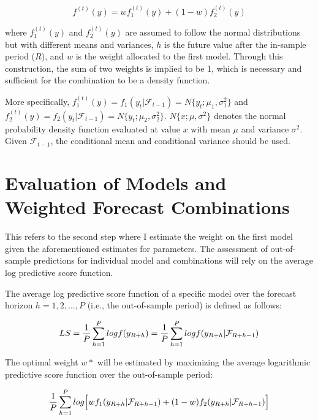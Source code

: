 \documentclass{monashthesis}
\begin{document}
\begin{equation}
f^{(t)}(y) = wf^{(t)}_1(y) + (1-w)f^{(t)}_2(y)
\end{equation}

where \(f^{(t)}_1(y)\) and \(f^{(t)}_2(y)\) are assumed to follow the normal distributions but with different means and variances, \(h\) is the future value after the in-sample period (\(R\)), and \(w\) is the weight allocated to the first model. Through this construction, the sum of two weights is implied to be 1, which is necessary and sufficient for the combination to be a density function\autocite{GA11}.

More specifically, \(f^{(t)}_1(y)=f_1(y_t|\mathcal{F}_{t-1})=N\{y_t; \mu_1, \sigma^2_1\}\) and \(f^{(t)}_2(y)=f_2(y_t|\mathcal{F}_{t-1})=N\{y_t; \mu_2, \sigma^2_2\}\). \(N\{x; \mu, \sigma^2\}\) denotes the normal probability density function evaluated at value \(x\) with mean \(\mu\) and variance \(\sigma^2\). Given \(\mathcal{F}_{t-1}\), the conditional mean and conditional variance should be used.

\hypertarget{evaluation}{%
\section{Evaluation of Models and Weighted Forecast Combinations}\label{evaluation}}

This refers to the second step where I estimate the weight on the first model given the aforementioned estimates for parameters. The assessment of out-of-sample predictions for individual model and combinations will rely on the average log predictive score function.

The average log predictive score function of a specific model over the forecast horizon \(h=1,2,...,P\) (i.e., the out-of-sample period) is defined as follows:

\begin{equation}
LS = \frac{1}{P}\sum^P_{h=1}logf(y_{\small{R+h}}) = \frac{1}{P}\sum^P_{h=1} logf(y_{\small{R+h}}| \mathcal{F}_{\small{R+h-1}})
\end{equation}

The optimal weight \(w*\) will be estimated by maximizing the average logarithmic predictive score function over the out-of-sample period:

\begin{equation}
\frac{1}{P}\sum^P_{h=1}log\Big[wf_1(y_{\small{R+h}}|\mathcal{F}_{\small{R+h-1}}) + (1-w)f_2(y_{\small{R+h}}|\mathcal{F}_{\small{R+h-1}})\Big]
\end{equation}
\end{document}

